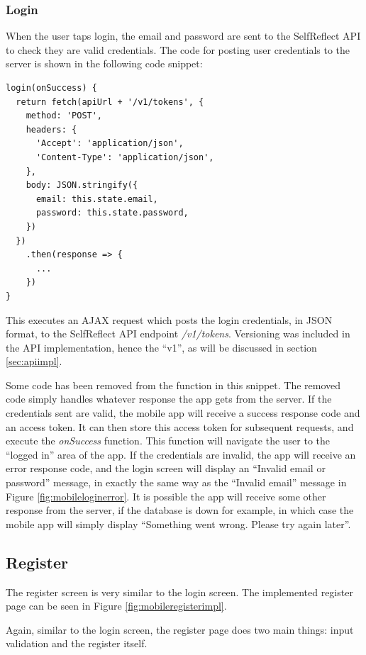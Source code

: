 \documentclass[11pt,openright,a4paper]{report}
\begin{document}
\subsubsection{Login}
When the user taps login, the email and password are sent to the SelfReflect API to check they are valid credentials. The code for posting user credentials to the server is shown in the following code snippet:
\begin{lstlisting}
login(onSuccess) {
  return fetch(apiUrl + '/v1/tokens', {
    method: 'POST',
    headers: {
      'Accept': 'application/json',
      'Content-Type': 'application/json',
    },
    body: JSON.stringify({
      email: this.state.email,
      password: this.state.password,
    })
  })
    .then(response => {
      ...
    })
}
\end{lstlisting}

This executes an AJAX request which posts the login credentials, in JSON format, to the SelfReflect API endpoint \emph{/v1/tokens}. Versioning was included in the API implementation, hence the \enquote{v1}, as will be discussed in section \ref{sec:apiimpl}.

Some code has been removed from the function in this snippet. The removed code simply handles whatever response the app gets from the server. If the credentials sent are valid, the mobile app will receive a success response code and an access token. It can then store this access token for subsequent requests, and execute the \emph{onSuccess} function. This function will navigate the user to the \enquote{logged in} area of the app. If the credentials are invalid, the app will receive an error response code, and the login screen will display an \enquote{Invalid email or password} message, in exactly the same way as the \enquote{Invalid email} message in Figure \ref{fig:mobileloginerror}. It is possible the app will receive some other response from the server, if the database is down for example, in which case the mobile app will simply display \enquote{Something went wrong. Please try again later}.

\subsection{Register}
The register screen is very similar to the login screen. The implemented register page can be seen in Figure \ref{fig:mobileregisterimpl}.

Again, similar to the login screen, the register page does two main things: input validation and the register itself.
\end{document}

